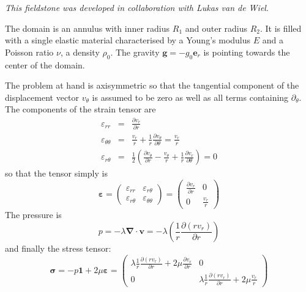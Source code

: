 {\sl This fieldstone was developed in collaboration with Lukas van de Wiel}.


The domain is an annulus with inner radius $R_1$ and outer radius $R_2$. It is filled with a 
single elastic material characterised by a Young's modulus $E$ and a Poisson ratio $\nu$, a
density $\rho_0$. The gravity ${\bm g}=-g_0 {\bm e}_r$ is pointing towards the center of the domain.

The problem at hand is axisymmetric so that the tangential component of the displacement
vector $v_\theta$ is assumed to be zero as well as all terms containing $\partial_\theta$.
The components of the strain tensor are 
\begin{eqnarray}
\varepsilon_{rr} &=& \frac{\partial v_r}{\partial r} \\
\varepsilon_{\theta\theta} &=& \frac{v_r}{r} + \frac{1}{r} \frac{\partial v_\theta}{\partial \theta}
= \frac{v_r}{r} 
 \\
\varepsilon_{r\theta} &=& \frac{1}{2} \left(   \frac{\partial v_\theta}{\partial r} - \frac{v_\theta}{r} 
+\frac{1}{r} \frac{\partial v_r}{\partial \theta}  \right) =0
\end{eqnarray}
so that the tensor simply is
\begin{equation}
{\bm \varepsilon} =
\left(
\begin{array}{cc}
\varepsilon_{rr} & \varepsilon_{r\theta} \\ 
\varepsilon_{r\theta} & \varepsilon_{\theta\theta} 
\end{array}
\right)
=
\left(
\begin{array}{cc}
\frac{\partial v_r}{\partial r} & 0 \\
0 &  \frac{v_r}{r} 
\end{array}
\right)
\end{equation}
The pressure is
\begin{equation}
p=-\lambda {\bm \nabla}\cdot {\bm v}
= -\lambda \left( \frac{1}{r} \frac{\partial (r v_r)}{\partial r} \right)
\end{equation}
and finally the stress tensor:
\begin{equation}
{\bm \sigma} 
= - p {\bm 1} + 2\mu {\bm \varepsilon}
=  
\left(
\begin{array}{cc}
\lambda \frac{1}{r} \frac{\partial (r v_r)}{\partial r} + 2\mu\frac{\partial v_r}{\partial r} & 0 \\
0 & \lambda \frac{1}{r} \frac{\partial (r v_r)}{\partial r}  +  2 \mu\frac{v_r}{r} 
\end{array}
\right)
\end{equation}
